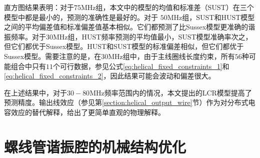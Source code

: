 


直方图结果表明：对于$75$MHz组，本文中的模型的均值和标准差（SUST）在三个模型中都是最小的，预测的准确性是最好的。对于 $50$MHz组，SUST和HUST模型之间的平均偏差值和标准偏差值基本相似。它们都预测了比Sussex模型更准确的谐振频率。对于$30$MHz组，HUST频率预测的平均值最小，SUST模型准确率次之，但它们都优于Sussex模型。HUST和SUST模型的标准偏差相似，但它们都优于Sussex模型。需要注意的是，在30MHz组中，由于主线圈线长度约束，所有$56$种可能组合中只有$11$个可行数据，参见公式\eqref{eq:helical_fixed_constraints_1}和\eqref{eq:helical_fixed_constraints_2}，因此结果可能会波动和偏差很大。

在上述结果中，对于$30-80$MHz频率范围内的情况，本文提出的LCR模型提高了预测精度。输出线效应（参见第\ref{section:helical_output_wire}节）作为对分布式电容效应的替代解释，给出了更简单直观的物理解释。

\section[螺线管谐振腔的机械结构优化]{螺线管谐振腔的机械结构优化}

